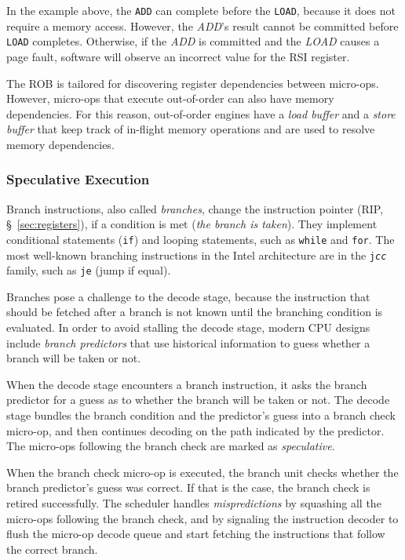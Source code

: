In the example above, the \texttt{ADD} can complete before the \texttt{LOAD},
because it does not require a memory access. However, the \textit{ADD}'s result
cannot be committed before \texttt{LOAD} completes. Otherwise, if the
\textit{ADD} is committed and the \textit{LOAD} causes a page fault, software
will observe an incorrect value for the  RSI register.


The ROB is tailored for discovering register dependencies between micro-ops.
However, micro-ops that execute out-of-order can also have memory dependencies.
For this reason, out-of-order engines have a \textit{load buffer} and a
\textit{store buffer} that keep track of in-flight memory operations and are
used to resolve memory dependencies.


\subsubsection{Speculative Execution}


Branch instructions, also called \textit{branches}, change the instruction
pointer (RIP, \S~\ref{sec:registers}), if a condition is met (\textit{the
branch is taken}). They implement conditional statements (\texttt{if}) and
looping statements, such as \texttt{while} and \texttt{for}. The most
well-known branching instructions in the Intel architecture are in the
\texttt{j\textit{cc}} family, such as \texttt{je} (jump if equal).

Branches pose a challenge to the decode stage, because the instruction that
should be fetched after a branch is not known until the branching condition is
evaluated. In order to avoid stalling the decode stage, modern CPU designs
include \textit{branch predictors} that use historical information to guess
whether a branch will be taken or not.

When the decode stage encounters a branch instruction, it asks the branch
predictor for a guess as to whether the branch will be taken or not. The
decode stage bundles the branch condition and the predictor's guess into a
branch check micro-op, and then continues decoding on the path indicated by the
predictor. The micro-ops following the branch check are marked as
\textit{speculative}.

When the branch check micro-op is executed, the branch unit checks whether the
branch predictor's guess was correct. If that is the case, the branch check is
retired successfully. The scheduler handles \textit{mispredictions} by
squashing all the micro-ops following the branch check, and by signaling the
instruction decoder to flush the micro-op decode queue and start fetching the
instructions that follow the correct branch.


